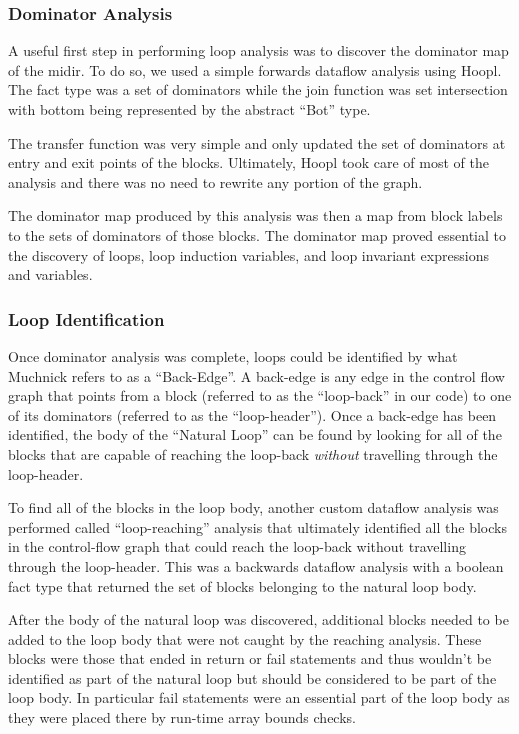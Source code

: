 \documentclass[11pt]{article}
\begin{document}
\subsubsection {Dominator Analysis} 

A useful first step in performing loop analysis was to discover the
dominator map of the midir. To do so, we used a simple forwards
dataflow analysis using Hoopl. The fact type was a set of dominators
while the join function was set intersection with bottom being
represented by the abstract ``Bot'' type. 

The transfer function was very simple and only updated the set of
dominators at entry and exit points of the blocks. Ultimately, Hoopl
took care of most of the analysis and there was no need to rewrite any
portion of the graph. 

The dominator map produced by this analysis was then a map from
block labels to the sets of dominators of those blocks. The dominator
map proved essential to the discovery of loops, loop induction
variables, and loop invariant expressions and variables. 

\subsubsection {Loop Identification}

Once dominator analysis was complete, loops could be identified by
what Muchnick refers to as a ``Back-Edge''. A back-edge is any edge in
the control flow graph that points from a block (referred to as the
``loop-back'' in our code) to one of its dominators (referred to as
the ``loop-header''). Once a back-edge has been identified, the body
of the ``Natural Loop'' can be found by looking for all of the blocks
that are capable of reaching the loop-back \emph{without} travelling
through the loop-header.  

To find all of the blocks in the loop body, another custom dataflow
analysis was performed called ``loop-reaching'' analysis that
ultimately identified all the blocks in the control-flow graph that
could reach the loop-back without travelling through the
loop-header. This was a backwards dataflow analysis with a boolean
fact type that returned the set of blocks belonging to the natural
loop body. 

After the body of the natural loop was discovered, additional blocks
needed to be added to the loop body that were not caught by the
reaching analysis. These blocks were those that ended in return or
fail statements and thus wouldn't be identified as part of the natural
loop but should be considered to be part of the loop body. In
particular fail statements were an essential part of the loop body as
they were placed there by run-time array bounds checks. 
\end{document}
